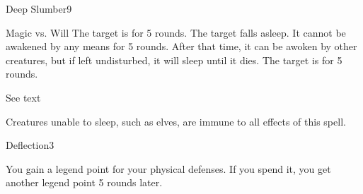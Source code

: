 \begin{spellsection}{Deep Slumber}{9}
\begin{spellheader}
\end{spellheader}
\begin{spellcontent}
    \begin{spelltargetinginfo}
    \end{spelltargetinginfo}
    \begin{spelleffects}
        \begin{spellattack}{Magic vs. Will}
            \spellsuccess The target is \blinded for 5 rounds.
            \spellcritical The target falls asleep. It cannot be awakened by any means for 5 rounds. After that time, it can be awoken by other creatures, but if left undisturbed, it will sleep until it dies.
            \spellfailure The target is \dazed for 5 rounds.
        \end{spellattack}
        \spelldur See text
    \end{spelleffects}
\end{spellcontent}
\begin{spellfooter}
    \spellnotes Creatures unable to sleep, such as elves, are immune to all effects of this spell.
\end{spellfooter}
\end{spellsection}

\begin{spellsection}{Deflection}{3}
\begin{spellheader}
\end{spellheader}
\begin{spellcontent}
    \begin{spelltargetinginfo}
    \end{spelltargetinginfo}
    \begin{spelleffects}
        \spelleffect You gain a legend point for your physical defenses. If you spend it, you get another legend point 5 rounds later.
        \spelldur \durlong
    \end{spelleffects}
\end{spellcontent}
\begin{spellfooter}
\end{spellfooter}
\end{spellsection}

